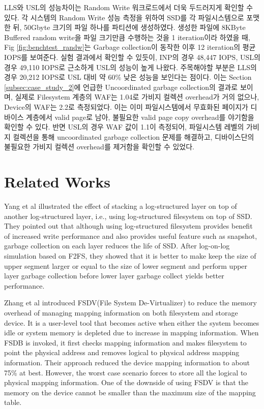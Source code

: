 \documentclass[letterpaper,twocolumn,10pt]{article}
\begin{document}
LLS와 USL의 성능차이는 Random Write 워크로드에서 더욱 두드러지게 확인할 수 있다. 각 시스템의 Random Write 성능 측정을 위하여 SSD를 각 파일시스템으로 포맷한 뒤, 50Gbyte 크기의 파일 하나를 파티션에 생성하였다. 생성한 파일에 8KByte Buffered random write을 파일 크기만큼 수행하는 것을 1 iteration이라 하였을 때, Fig \ref{fig:benchtest_randw}는 Garbage collection이 동작한 이후 12 iteration의 평균 IOPS를 보여준다. 실험 결과에서 확인할 수 있듯이, INP의 경우 48,447 IOPS, USL의 경우 49,110 IOPS로 근소하게 USL의 성능이 높게 나왔다. 주목해야할 부분은 LLS의 경우 20,212 IOPS로 USL 대비 약 60\% 낮은 성능을 보인다는 점이다. 이는 Section \ref{subsec:case_study_2}에 언급한 Uncoordinated garbage collection의 결과로 보이며, 실제로 Filesystem 계층의 WAF는 1.04로 가비지 컬렉션 overhead가 거의 없으나, Device의 WAF는 2.2로 측정되었다. 이는 이미 파일시스템에서 무효화된 페이지가 디바이스 계층에서 valid page로 남아, 불필요한 valid page copy overhead를 야기함을 확인할 수 있다. 반면 USL의 경우 WAF 값이 1.1이 측정되어, 파일시스템 레벨의 가비지 컬렉션을 통해 uncoordinated garbage collection 문제를 해결하고, 디바이스단의 불필요한 가비지 컬렉션 overhead를 제거함을 확인할 수 있었다.
 
\section{Related Works}
\label{related_works}

Yang et al\cite{yang2014don} illustrated the effect of stacking a log-structured layer on top of another log-structured layer, i.e., using log-structured filesystem on top of SSD. They pointed out that although using log-structured filesystem provides benefit of increased write performance and also provides useful feature such as snapshot, garbage collection on each layer reduces the life of SSD. After log-on-log simulation based on F2FS, they showed that it is better to make keep the size of upper segment larger or equal to the size of lower segment and perform upper layer garbage collection before lower layer garbage collect yields better performance.

Zhang et al\cite{zhangremoving} introduced FSDV(File System De-Virtualizer) to reduce the memory overhead of managing mapping information on both filesystem and storage device. It is a user-level tool that becomes active when either the system becomes idle or system memory is depleted due to increase in mapping information. When FSDB is invoked, it first checks mapping information and makes filesystem to point the physical address and removes logical to physical address mapping information. Their approach reduced the device mapping information to about 75\% at best. However, the worst case scenario forces to store all the logical to physical mapping information. One of the downside of using FSDV is that the memory on the device cannot be smaller than the maximum size of the mapping table.
\end{document}
